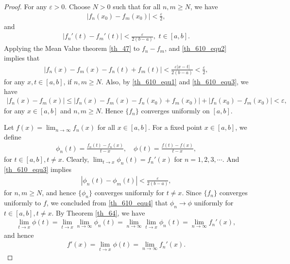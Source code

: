 \documentclass[10pt]{book}
\theoremstyle{definition}
\numberwithin{equation}{chapter}
\begin{document}
\begin{proof}
For any $\varepsilon > 0$. Choose $N > 0$ such that for all $n,m \geq N$, we have
\begin{align}\label{th_610_equ1}
    \left|f_n(x_0) - f_m(x_0)\right| < \frac{\varepsilon}{2},
\end{align}
and
\begin{align}\label{th_610_equ2}
    \left|f_n'(t) - f_m'(t)\right| < \frac{\varepsilon}{2(b - a)}, \,\, t \in [a,b].
\end{align}
Applying the Mean Value theorem \ref{th_47} to $f_n - f_m$, and \eqref{th_610_equ2} implies that 
\begin{align}\label{th_610_equ3}
    \left|f_n(x) - f_m(x) - f_n(t) + f_m(t)\right| < \frac{\varepsilon \left|x - t\right|}{2(b - a)} < \frac{\varepsilon}{2},
\end{align}
for any $x,t \in [a,b]$, if $n,m \geq N$. Also, by \eqref{th_610_equ1} and \eqref{th_610_equ3}, we have
\begin{align*}
    \left|f_n(x) - f_m(x)\right| \leq \left|f_n(x) - f_m(x) - f_n(x_0) + f_m(x_0)\right| + \left|f_n(x_0) - f_m(x_0)\right| < \varepsilon,
\end{align*}
for any $x \in [a,b]$ and $n,m \geq N$. Hence $\{f_n\}$ converges uniformly on $[a,b]$.

Let $f(x) = \lim_{n\to\infty} f_n(x)$ for all $x \in [a,b]$. For a fixed point $x \in [a,b]$, we define
\begin{align}\label{th_610_equ4}
    \phi_n(t) = \frac{f_n(t) - f_n(x)}{t - x}, \quad \phi(t) = \frac{f(t) - f(x)}{t - x},
\end{align}
for $t \in [a,b], t \neq x$. Clearly, $\lim_{t\to x} \phi_n(t) = f_n'(x)$ for $n = 1,2,3,\cdots$. And \eqref{th_610_equ3} implies
\begin{align}
    \left|\phi_n(t) - \phi_m(t)\right| < \frac{\varepsilon}{2(b - a)},
\end{align}
for $n,m \geq N$, and hence $\{\phi_n\}$ converges uniformly for $t \neq x$. Since $\{f_n\}$ converges uniformly to $f$, we concluded from \eqref{th_610_equ4} that $\phi_n \to \phi$ uniformly for $t \in [a,b], t \neq x$. By Theorem \ref{th_64}, we have
\begin{align*}
    \lim_{t\to x} \phi(t) = \lim_{t\to x} \lim_{n\to\infty} \phi_n(t) = \lim_{n\to\infty} \lim_{t\to x} \phi_n(t) = \lim_{n\to\infty} f_n'(x),
\end{align*}
and hence
\begin{align*}
    f'(x) = \lim_{t\to x} \phi(t) = \lim_{n\to\infty} f_n'(x).
\end{align*}
\end{proof}
\end{document}
